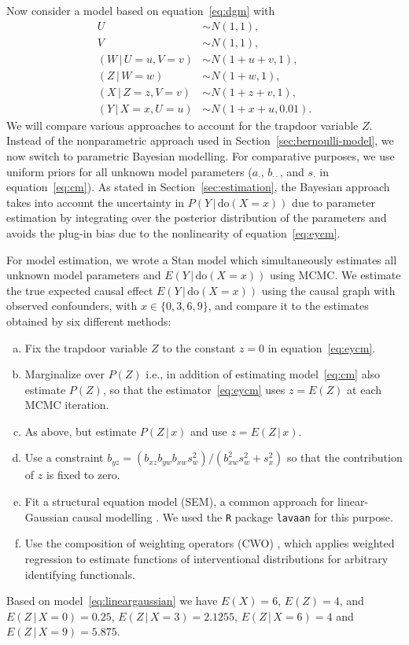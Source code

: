 \documentclass[11pt,a4paper,twoside]{article}
\newcommand{\+}[1]{\ensuremath{\mathbf{#1}}}
\newcommand{\doo}{\textrm{do}}
\newcommand{\given}{{ \, | \, }}
\begin{document}
	Now consider a model based on equation~\eqref{eq:dgm} with
	\begin{equation}
	\label{eq:lineargaussian}
	\begin{aligned}
	U &\sim N(1, 1),\\
	V &\sim N(1, 1),\\
	(W \given U = u, V = v) &\sim N(1 + u + v, 1),\\
	(Z \given W = w) &\sim N(1 + w, 1),\\
	(X \given Z = z, V = v) &\sim N(1 + z + v, 1),\\
	(Y \given X = x, U = u) &\sim N(1 + x + u, 0.01).
	\end{aligned}
	\end{equation}
	We will compare various approaches to account for the trapdoor variable $Z$. Instead of the nonparametric approach used in Section~\ref{sec:bernoulli-model}, we now switch to parametric Bayesian modelling. For comparative purposes, we use uniform priors for all unknown model parameters ($a_{\cdot}$, $b_{\cdot\cdot}$, and $s_{\cdot}$ in equation~\eqref{eq:cm}). As stated in Section~\ref{sec:estimation}, the Bayesian approach takes into account the uncertainty in $P(Y\given \doo(X = x))$ due to parameter estimation by integrating over the posterior distribution of the parameters and avoids the plug-in bias due to the nonlinearity of equation~\eqref{eq:eycm}. 
	
	For model estimation, we wrote a Stan model \citep{Stan, rstan} which simultaneously estimates all unknown model parameters and $E(Y \given \doo(X = x))$ using MCMC. We estimate the true expected causal effect $E(Y \given \doo(X = x))$ using the causal graph with observed confounders, with $x \in \{0, 3, 6, 9\}$, and compare it to the estimates obtained by six different methods:
	
	\begin{enumerate}[(a),leftmargin=*]
		\itemsep=0em
		\item Fix the trapdoor variable $Z$ to the constant $z=0$ in equation~\eqref{eq:eycm}.
		\item Marginalize over $P(Z)$ i.e., in addition of estimating model~\eqref{eq:cm} also estimate $P(Z)$, so that the estimator~\eqref{eq:eycm} uses $z = E(Z)$ at each MCMC iteration.
		\item As above, but estimate $P(Z \given  x)$ and use $z = E(Z \given x)$.
		\item Use a constraint $b_{yz} = (b_{xz}b_{yw} b_{xw} s_w^2)/(b_{xw}^2 s_w^2+s_x^2)$ so that the contribution of $z$ is fixed to zero.
		\item Fit a structural equation model (SEM), a common approach for linear-Gaussian causal modelling \citep{Kline2011}. We used the \texttt{R} package \texttt{lavaan} \citep{lavaan} for this purpose.
		\item Use the composition of weighting operators (CWO) \citep{jung2020}, which applies weighted regression to estimate functions of interventional distributions for arbitrary identifying functionals.
	\end{enumerate}
	Based on model~\eqref{eq:lineargaussian} we have $E(X) = 6$, $E(Z) = 4$, and $E(Z \given  X = 0) = 0.25$, $E(Z \given  X =3) = 2.1255$, $E(Z \given  X =6) = 4$ and $E(Z \given  X =9) = 5.875$. 
	
\end{document}
